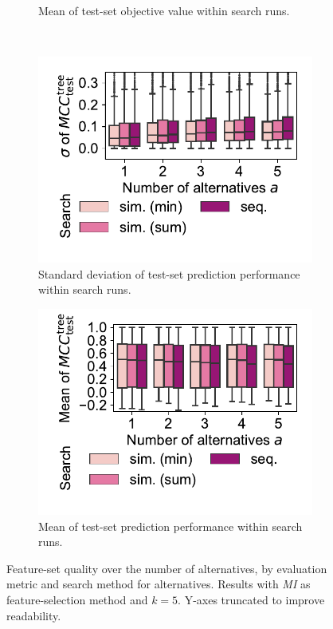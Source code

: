 \documentclass{article}
\theoremstyle{definition}
\begin{document}
\begin{figure}[p]
\begin{subfigure}[t]{0.48\textwidth}
		\caption{Mean of test-set objective value with\-in search runs.}
		\label{fig:afs:impact-search-mean-test-objective}
	\end{subfigure}
	\\ \vspace{\baselineskip}
	\begin{subfigure}[t]{0.48\textwidth}
		\centering
		\includegraphics[width=\textwidth, trim=15 25 15 5, clip]{plots/afs-impact-search-stddev-decision-tree-test-mcc.pdf}
		\caption{Standard deviation of test-set prediction performance within search runs.}
		\label{fig:afs:impact-search-stddev-decision-tree-test-mcc}
	\end{subfigure}
	\hfill
	\begin{subfigure}[t]{0.48\textwidth}
		\centering
		\includegraphics[width=\textwidth, trim=15 25 15 5, clip]{plots/afs-impact-search-mean-decision-tree-test-mcc.pdf}
		\caption{Mean of test-set prediction performance within search runs.}
		\label{fig:afs:impact-search-mean-decision-tree-test-mcc}
	\end{subfigure}
	\caption{
		Feature-set quality over the number of alternatives, by evaluation metric and search method for alternatives.
		Results with \emph{MI} as feature-selection method and $k=5$.
		Y-axes truncated to improve readability.
	}
	\label{fig:afs:impact-search-quality}
\end{figure}
\end{document}
